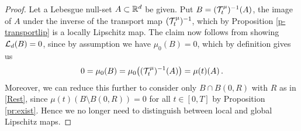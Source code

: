 \begin{proof}
%	
%	

	Let a Lebesgue null-set $A\subset\mathbb{R}^d$ be given. Put $B=(\mathcal{T}^\mu_t)^{-1}(A)$,
	the image of $A$ under the inverse of the transport map $(\mathcal{T}^\mu_t)^{-1}$, which by Proposition \ref{p-transportlip} is a locally Lipschitz map. The claim now follows from showing $\mathcal{L}_d(B)=0$,
	since by assumption we have $\mu_0(B)=0$, which by definition gives us
	\begin{align*}
		0=\mu_0(B)=\mu_0\bigl((\mathcal{T}^\mu_t)^{-1}(A)\bigr) = \mu(t)(A)\,.
	\end{align*}
	Moreover, we can reduce this further to consider only $B\cap B(0,R)$ with $R$ as in
	\eqref{Rest}, since $\mu(t)(B\setminus B(0,R))=0$ for all $t \in [0,T]$ by Proposition \ref{pr:exist}. Hence we no longer need to distinguish
	between local and global Lipschitz maps.
	

\end{proof}
